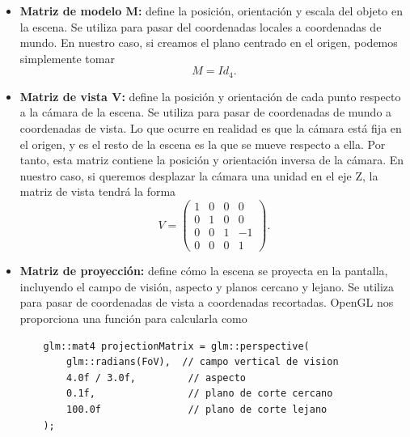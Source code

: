 \begin{itemize}
    \item \textbf{Matriz de modelo $\boldsymbol{M}$:} define la posición, orientación y escala del objeto en la escena. Se utiliza para pasar del coordenadas locales a coordenadas de mundo. En nuestro caso, si creamos el plano centrado en el origen, podemos simplemente tomar
    \begin{equation*}
        M = Id_{4}.
    \end{equation*}
    \item \textbf{Matriz de vista  $\boldsymbol{V}$:} define la posición y orientación de cada punto respecto a la cámara de la escena. Se utiliza para pasar de coordenadas de mundo a coordenadas de vista. Lo que ocurre en realidad es que la cámara está fija en el origen, y es el resto de la escena es la que se mueve respecto a ella. Por tanto, esta matriz contiene la posición y orientación inversa de la cámara. En nuestro caso, si queremos desplazar la cámara una unidad en el eje Z, la matriz de vista tendrá la forma
    \begin{equation*}
        V = \begin{pmatrix}
        1 & 0 & 0 & 0\\
        0 & 1 & 0 & 0\\
        0 & 0 & 1 & -1\\
        0 & 0 & 0 & 1
        \end{pmatrix}.
    \end{equation*}
    
    \item \textbf{Matriz de proyección:} define cómo la escena se proyecta en la pantalla, incluyendo el campo de visión, aspecto y planos cercano y lejano. Se utiliza para pasar de coordenadas de vista a coordenadas recortadas. OpenGL nos proporciona una función para calcularla como
    \begin{lstlisting}
    glm::mat4 projectionMatrix = glm::perspective(
        glm::radians(FoV),  // campo vertical de vision
        4.0f / 3.0f,         // aspecto
        0.1f,                // plano de corte cercano
        100.0f               // plano de corte lejano
    );
    \end{lstlisting}
\end{itemize}

